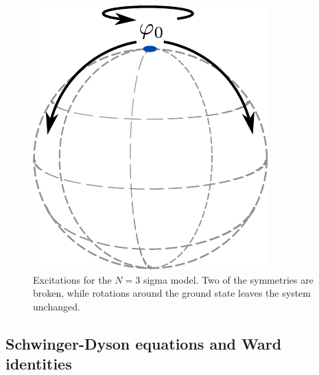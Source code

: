 \begin{figure}[h]
    \centering
    \includegraphics[width=.35\linewidth]{figurer/SU(3).pdf}
    \caption{Excitations for the $N=3$ sigma model. Two of the symmetries are broken, while rotations around the ground state leaves the system unchanged.}
    \label{fig: ground state manifold}
\end{figure}




\subsection{Schwinger-Dyson equations and Ward identities}
\label{subsection: ward identities}


